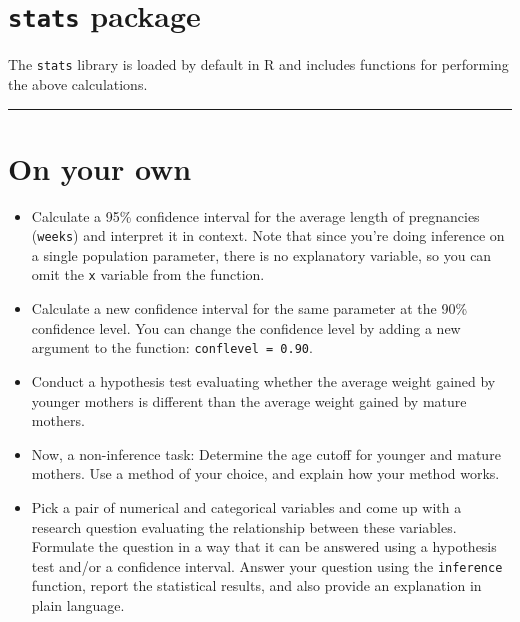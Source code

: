 \documentclass[]{book}
\newenvironment{Shaded}{\begin{snugshade}}{\end{snugshade}}
\newcommand{\KeywordTok}[1]{\textcolor[rgb]{0.13,0.29,0.53}{\textbf{{#1}}}}
\newcommand{\StringTok}[1]{\textcolor[rgb]{0.31,0.60,0.02}{{#1}}}
\newcommand{\NormalTok}[1]{{#1}}
\theoremstyle{definition}
\theoremstyle{definition}
\theoremstyle{remark}
\begin{document}
\section*{\texorpdfstring{\texttt{stats}
package}{stats package}}\label{stats-package}

The \texttt{stats} library is loaded by default in R and includes
functions for performing the above calculations.

\begin{Shaded}
\end{Shaded}

\begin{center}\rule{0.5\linewidth}{\linethickness}\end{center}

\section*{On your own}\label{on-your-own-4}

\begin{itemize}
\item
  Calculate a 95\% confidence interval for the average length of
  pregnancies (\texttt{weeks}) and interpret it in context. Note that
  since you're doing inference on a single population parameter, there
  is no explanatory variable, so you can omit the \texttt{x} variable
  from the function.
\item
  Calculate a new confidence interval for the same parameter at the 90\%
  confidence level. You can change the confidence level by adding a new
  argument to the function: \texttt{conflevel\ =\ 0.90}.
\item
  Conduct a hypothesis test evaluating whether the average weight gained
  by younger mothers is different than the average weight gained by
  mature mothers.
\item
  Now, a non-inference task: Determine the age cutoff for younger and
  mature mothers. Use a method of your choice, and explain how your
  method works.
\item
  Pick a pair of numerical and categorical variables and come up with a
  research question evaluating the relationship between these variables.
  Formulate the question in a way that it can be answered using a
  hypothesis test and/or a confidence interval. Answer your question
  using the \texttt{inference} function, report the statistical results,
  and also provide an explanation in plain language.
\end{itemize}
\end{document}
